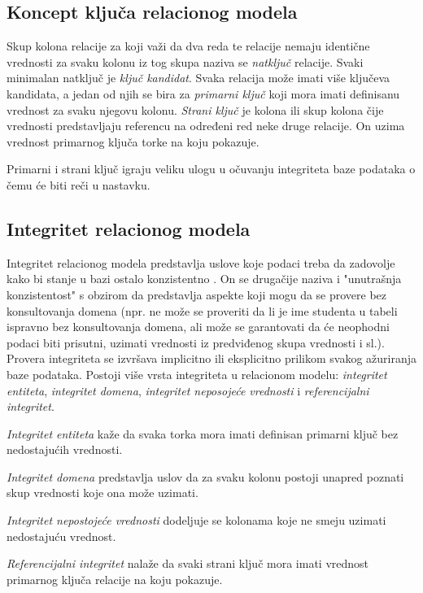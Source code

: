 \documentclass[12pt,oneside]{memoir}
\begin{document}
\subsection{Koncept ključa relacionog modela}

Skup kolona relacije za koji važi da dva reda te relacije nemaju identične vrednosti za svaku kolonu iz tog skupa naziva  se \textit{natključ} relacije. Svaki minimalan natključ je \textit{ključ kandidat}. Svaka relacija može imati više ključeva kandidata, a jedan od njih se bira za  \textit{primarni ključ} koji mora imati definisanu vrednost za svaku njegovu kolonu.
\textit{Strani ključ} je kolona ili skup kolona čije vrednosti predstavljaju referencu na određeni red neke druge relacije. On uzima vrednost primarnog ključa torke na koju pokazuje. 

Primarni i strani ključ igraju veliku ulogu u očuvanju integriteta baze podataka o čemu će biti reči u nastavku.

\subsection{Integritet relacionog modela}

Integritet relacionog modela predstavlja uslove koje podaci treba da zadovolje kako bi stanje u bazi ostalo konzistentno \cite{URBP}. On se drugačije naziva i "unutrašnja konzistentost" s obzirom da predstavlja aspekte koji mogu da se provere bez konsultovanja domena (npr. ne može se proveriti da li je ime studenta u tabeli ispravno bez konsultovanja domena, ali može se garantovati da će neophodni podaci biti prisutni, uzimati vrednosti iz predviđenog skupa vrednosti i sl.). Provera integriteta se izvršava implicitno ili eksplicitno prilikom svakog ažuriranja baze podataka. Postoji više vrsta integriteta u relacionom modelu:  \textit{integritet entiteta}, \textit{integritet domena}, \textit{integritet neposojeće vrednosti} i \textit{referencijalni integritet}.

 \textit{Integritet entiteta} kaže da svaka torka mora imati definisan primarni ključ bez nedostajućih vrednosti.

\textit{Integritet domena} predstavlja uslov da za svaku kolonu postoji unapred poznati skup vrednosti koje ona može uzimati.

\textit{Integritet nepostojeće vrednosti} dodeljuje se kolonama koje  ne smeju uzimati nedostajuću vrednost.

\textit{Referencijalni integritet} nalaže da svaki strani ključ mora imati vrednost primarnog ključa relacije na koju pokazuje.
\end{document}

